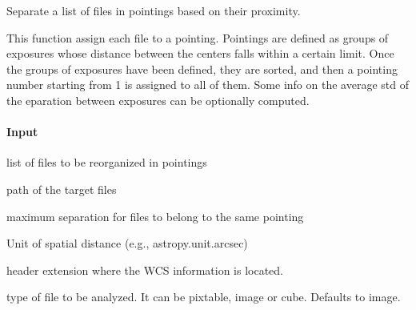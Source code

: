 \documentclass[letterpaper,10pt,english]{sphinxmanual}
\begin{document}
\begin{fulllineitems}
\label{\detokenize{api/pymusepipe:pymusepipe.util_image.group_exposures_per_pointing}}
\pysigstartsignatures
{}
\pysigstopsignatures
\sphinxAtStartPar
Separate a list of files in pointings based on their proximity.

\sphinxAtStartPar
This function assign each file to a pointing. Pointings are defined as groups of exposures
whose distance between the centers falls within a certain limit. Once the groups of exposures
have been defined, they are sorted, and then a pointing number starting from 1 is assigned to
all of them. Some info on the average std of the eparation between exposures can be optionally
computed.


\paragraph{Input}
\label{\detokenize{api/pymusepipe:id150}}\begin{description}
\sphinxAtStartPar
list of files to be reorganized in pointings

\sphinxAtStartPar
path of the target files

\sphinxAtStartPar
maximum separation for files to belong to the same pointing

\sphinxAtStartPar
Unit of spatial distance (e.g., astropy.unit.arcsec)

\sphinxAtStartPar
header extension where the WCS information is located.

\sphinxAtStartPar
type of file to be analyzed. It can be pixtable, image or cube. Defaults to image.


\end{description}
\end{fulllineitems}
\end{document}
